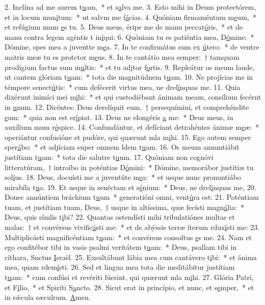 2. Inclína ad me aurem t\uline{u}am,~* et s\uline{a}lva me.
3. Esto mihi in Deum protectórem, et in locum mun\uline{í}tum:~* ut salvm me f\uline{á}cias.
4. Quóniam firmaméntum m\uline{e}um,~* et refúgium mum \uline{e}s tu.
5. Deus meus, éripe me de manu peccat\uline{ó}ris,~* et de manu contra legem agéntis t in\uline{í}qui:
6. Quóniam tu es patiéntia mea, D\uline{ó}mine:~* Dómine, spes mea a juventte m\uline{e}a.
7. In te confirmátus sum ex \uline{ú}tero:~* de ventre matris meæ tu es protctor m\uline{e}us.
8. In te cantátio mea semper:~† tamquam prodígium factus sum m\uline{u}ltis:~* et tu adjtor f\uline{o}rtis.
9. Repleátur os meum laude, ut cantem glóriam t\uline{u}am:~* tota die magnitúdnem t\uline{u}am.
10. Ne projícias me in témpore senect\uline{ú}tis:~* cum defécerit virtus mea, ne drel\uline{í}nquas me.
11. Quia dixérunt inimíci mei m\uline{i}hi:~* et qui custodiébant ánimam meam, consílium fecérnt in \uline{u}num.
12. Dicéntes: Deus derelíquit eum,~† persequímini, et comprehéndite \uline{e}um:~* quia non est  er\uline{í}piat.
13. Deus ne elongéris \uline{a} me:~* Deus meus, in auxílium mum r\uline{é}spice.
14. Confundántur, et defíciant detrahéntes ánimæ m\uline{e}æ:~* operiántur confusióne et pudóre, qui quærunt mla m\uline{i}hi.
15. Ego autem semper sper\uline{á}bo:~* et adjíciam super omnem ldem t\uline{u}am.
16. Os meum annuntiábit justítiam t\uline{u}am:~* tota die salutre t\uline{u}um.
17. Quóniam non cognóvi litteratúram,~† introíbo in poténtias D\uline{ó}mini:~* Dómine, memorábor justítiæ tu sol\uline{í}us.
18. Deus, docuísti me a juventúte m\uline{e}a:~* et usque nunc pronuntiábo mirabíla t\uline{u}a.
19. Et usque in senéctam et s\uline{é}nium:~* Deus, ne drel\uline{í}nquas me,
20. Donec annúntiem bráchium t\uline{u}um~* generatióni omni,  vent\uline{ú}ra est:
21. Poténtiam tuam, et justítiam tuam, Deus,~† usque in altíssima, quæ fecísti magn\uline{á}lia:~* Deus, quis símlis t\uline{i}bi?
22. Quantas ostendísti mihi tribulatiónes multas et malas:~† et convérsus vivific\uline{á}sti me:~* et de abýssis terræ íterum rdux\uline{í}sti me:
23. Multiplicásti magnificéntiam t\uline{u}am:~* et convérsus consoltus \uline{e}s me.
24. Nam et ego confitébor tibi in vasis psalmi veritátem t\uline{u}am:~* Deus, psallam tibi in cíthara, Snctus \uline{I}sraël.
25. Exsultábunt lábia mea cum cantávero t\uline{i}bi:~* et ánima mea, quam rdem\uline{í}sti.
26. Sed et lingua mea tota die meditábitur justítiam t\uline{u}am:~* cum confúsi et revériti fúerint, qui quærunt mla m\uline{i}hi.
27. Glória Patri, et F\uline{í}lio,~* et Spiríti S\uline{a}ncto.
28. Sicut erat in princípio, et nunc, et s\uline{e}mper,~* et in sǽcula sæculrum. \uline{A}men.

